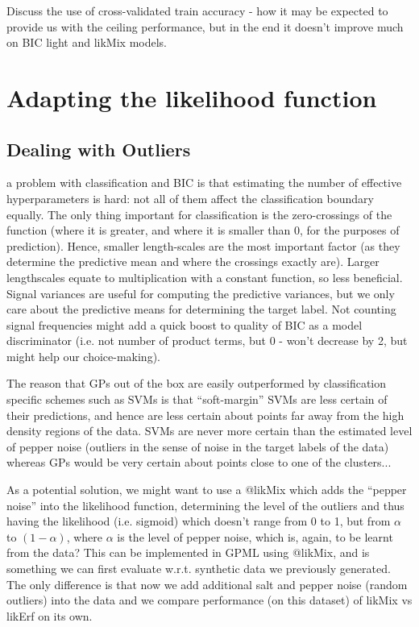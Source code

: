 \documentclass[a4paper,12pt ]{report}
\begin{document}
Discuss the use of cross-validated train accuracy - how it may be expected to provide us with the ceiling performance, but in the end it doesn't improve much on BIC light and likMix models. 



\clearpage
\section{Adapting the likelihood function}

\subsection{Dealing with Outliers}

a problem with classification and BIC is that estimating the number of effective hyperparameters is hard: not all of them affect the classification boundary equally. The only thing important for classification is the zero-crossings of the function (where it is greater, and where it is smaller than 0, for the purposes of prediction). Hence, smaller length-scales are the most important factor (as they determine the predictive mean and where the crossings exactly are). Larger lengthscales equate to multiplication with a constant function, so less beneficial. Signal variances are useful for computing the predictive variances, but we only care about the predictive means for determining the target label. Not counting signal frequencies might add a quick boost to quality of BIC as a model discriminator (i.e. not number of product terms, but 0 - won’t decrease by 2, but might help our choice-making). 

The reason that GPs out of the box are easily outperformed by classification specific schemes such as SVMs is that “soft-margin” SVMs are less certain of their predictions, and hence are less certain about points far away from the high density regions of the data. SVMs are never more certain than the estimated level of pepper noise (outliers in the sense of noise in the target labels of the data) whereas GPs would be very certain about points close to one of the clusters...

As a potential solution, we might want to use a @likMix which adds the “pepper noise” into the likelihood function, determining the level of the outliers and thus having the likelihood (i.e. sigmoid) which doesn’t range from 0 to 1, but from $\alpha$ to $(1 - \alpha)$, where $\alpha$ is the level of pepper noise, which is, again, to be learnt from the data? This can be implemented in GPML using @likMix, and is something we can first evaluate w.r.t. synthetic data we previously generated. The only difference is that now we add additional salt and pepper noise (random outliers) into the data and we compare performance (on this dataset) of likMix vs likErf on its own.
\end{document}
